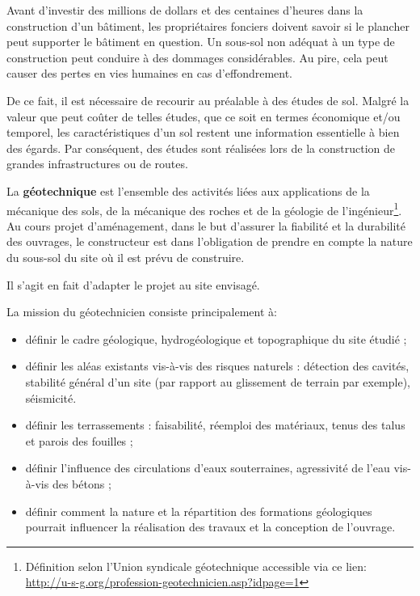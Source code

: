 \par
Avant d’investir des millions de dollars et des centaines d’heures dans la 
construction d'un bâtiment, les propriétaires fonciers doivent savoir si le 
plancher peut supporter le bâtiment en question.
Un sous-sol non adéquat à un type de construction peut conduire à des 
dommages considérables. Au pire, cela peut causer des pertes en vies humaines 
en cas d'effondrement.
\par
De ce fait, il est nécessaire de recourir au préalable à des études de sol.   
Malgré la valeur que peut coûter de telles études, que ce soit en termes
économique et/ou temporel, les caractéristiques d’un sol restent une
information essentielle à bien des égards. Par conséquent, des études sont 
réalisées lors de la construction de grandes infrastructures ou de routes. 
\par 
La \textbf{géotechnique} est l’ensemble des 
activités liées aux applications de la mécanique des sols, de la mécanique 
des roches et de la géologie de l’ingénieur\footnote{
    Définition selon l’Union syndicale géotechnique accessible via ce lien: 
    \url{http://u-s-g.org/profession-geotechnicien.asp?idpage=1}}.
Au cours projet d'aménagement, dans le but d'assurer  la fiabilité et la durabilité
des ouvrages, le constructeur est dans l'obligation de prendre en compte
la nature du sous-sol du site où il est prévu de construire.

Il s'agit en fait d'adapter le projet au site envisagé.
\par
La mission du géotechnicien consiste principalement à:
\begin{itemize}
    \item définir le cadre géologique, hydrogéologique et topographique 
    du site étudié ;
    \item définir les aléas existants vis-à-vis des risques naturels : 
    détection des cavités, stabilité général d’un site (par rapport au 
    glissement de terrain par exemple), séismicité.
    \item définir les terrassements : faisabilité, réemploi des matériaux, 
    tenus des talus et parois des fouilles ;
    \item définir l’influence des circulations d’eaux souterraines, 
    agressivité de l’eau vis-à-vis des bétons ;
    \item définir comment la nature et la répartition des 
    formations géologiques pourrait influencer la réalisation des travaux et la conception 
    de l’ouvrage.
\end{itemize}
